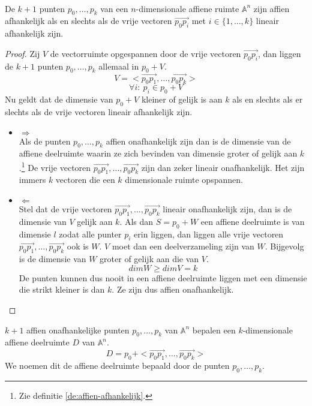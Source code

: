\documentclass[main.tex]{subfiles}
\begin{document}
\begin{st}
  \label{st:critirium-affien-afhankelijk}
  \\
  De $k+1$ punten $p_{0},\dotsc,p_{k}$ van een $n$-dimensionale affiene ruimte $\mathbb{A}^{n}$ zijn affien afhankelijk als en slechts als de vrije vectoren $\vec{p_{0}p_{i}}$ met $i \in \{1,\dotsc,k\}$ lineair afhankelijk zijn.

  \begin{proof}
    Zij $V$ de vectorruimte opgespannen door de vrije vectoren $\overrightarrow{p_{0}p_{i}}$, dan liggen de $k+1$ punten $p_{0},\dotsc,p_{k}$ allemaal in $p_{0} + V$.
    \[ V = <\overrightarrow{p_{0}p_{1}},\dotsc,\overrightarrow{p_{0}p_{k}}> \]
    \[ \forall i:\ p_{i} \in p_{0}+V \]
    Nu geldt dat de dimensie van $p_{0} + V$ kleiner of gelijk is aan $k$ als en slechts als er slechts als de vrije vectoren lineair afhankelijk zijn.
    \begin{itemize}
    \item $\Rightarrow$\\
      Als de punten $p_{0},\dotsc,p_{k}$ affien onafhankelijk zijn dan is de dimensie van de affiene deelruimte waarin ze zich bevinden van dimensie groter of gelijk aan $k$.\footnote{Zie definitie \ref{de:affien-afhankelijk}.}
      De vrije vectoren $\overrightarrow{p_{0}p_{1}},\dotsc,\overrightarrow{p_{0}p_{k}}$ zijn dan zeker lineair onafhankelijk.
      Het zijn immers $k$ vectoren die een $k$ dimensionale ruimte opspannen.
    \item $\Leftarrow$\\
      Stel dat de vrije vectoren $\overrightarrow{p_{0}p_{1}},\dotsc,\overrightarrow{p_{0}p_{k}}$ lineair onafhankelijk zijn, dan is de dimensie van $V$ gelijk aan $k$.
      Als dan $S = p_{0}+W$ een affiene deelruimte is van dimensie $l$ zodat alle punter $p_{i}$ erin liggen, dan liggen alle vrije vectoren $\overrightarrow{p_{0}p_{1}},\dotsc,\overrightarrow{p_{0}p_{k}}$ ook is $W$. $V$ moet dan een deelverzameling zijn van $W$. Bijgevolg is de dimensie van $W$ groter of gelijk aan die van $V$.
      \[ dim W \ge dim V = k \]
      De punten kunnen dus nooit in een affiene deelruimte liggen met een dimensie die strikt kleiner is dan $k$.
      Ze zijn dus affien onafhankelijk.
    \end{itemize}
  \end{proof}
\end{st}

\begin{gev}
  $k+1$ affien onafhankelijke punten $p_{0},\dotsc,p_{k}$ van $\mathbb{A}^{n}$ bepalen een $k$-dimensionale affiene deelruimte $D$ van $\mathbb{A}^{n}$.
  \[ D = p_{0} + <\overrightarrow{p_{0}p_{1}},\dotsc,\overrightarrow{p_{0}p_{k}}> \]
  We noemen dit de affiene deelruimte bepaald door de punten $p_{0},\dotsc,p_{k}$.

\end{gev}
\end{document}
